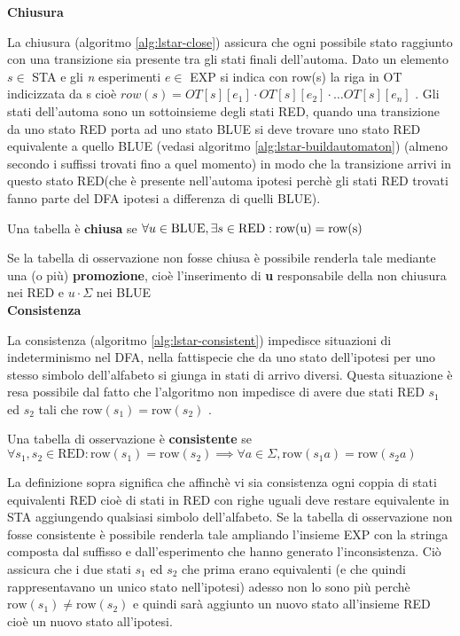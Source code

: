 {\large\textbf{Chiusura}}

La chiusura (algoritmo \ref{alg:lstar-close}) assicura che ogni possibile stato raggiunto con una transizione sia presente tra gli stati finali dell'automa. Dato un elemento $s \in$ STA e gli \textit{n} esperimenti $e \in $ EXP si indica con row(s) la riga in OT indicizzata da s cioè $row(s)=OT[s][e_1] \cdot OT[s][e_2] \cdot \dots OT[s][e_n]$ . Gli stati dell'automa sono un sottoinsieme degli stati RED, quando una transizione da uno stato RED porta ad uno stato BLUE  si deve trovare uno stato RED equivalente a quello BLUE (vedasi algoritmo \ref{alg:lstar-buildautomaton}) (almeno secondo i suffissi trovati fino a quel momento) in modo che la transizione arrivi in questo stato RED(che è presente nell'automa ipotesi perchè gli stati RED trovati fanno parte del \ac{DFA} ipotesi a differenza di quelli BLUE).
\begin{definizione*} Una tabella è \textbf{chiusa} se $\forall u \in \text{BLUE}, \exists s\\ \in \text{RED} : \text{row(u)} = \text{row(s)}$
\end{definizione*}
Se la tabella di osservazione non fosse chiusa è possibile renderla tale mediante una (o più) \textbf{promozione}, cioè l'inserimento di \textbf{u} responsabile della non chiusura nei RED e $u \cdot \Sigma$ nei BLUE\\

{\large\textbf{Consistenza}}

La consistenza  (algoritmo \ref{alg:lstar-consistent}) impedisce situazioni di indeterminismo nel DFA, nella fattispecie che da uno stato dell'ipotesi per uno stesso simbolo dell'alfabeto si giunga in stati di arrivo diversi. Questa situazione è resa possibile dal fatto che l'algoritmo non impedisce di avere due stati RED $s_1$ ed $s_2$ tali che $\text{row}(s_1) = \text{row}(s_2)$ . 
\begin{definizione*}Una tabella di osservazione è \textbf{consistente} se $\forall s_1,s_2 \in \text{RED} : \text{row}(s_1)=\text{row}(s_2)\implies\forall a \in \Sigma,\text{row}(s_1a)=\text{row}(s_2a)$
\end{definizione*} 

La definizione sopra significa che affinchè vi sia consistenza ogni coppia di stati equivalenti RED cioè di stati in RED con righe uguali deve restare equivalente in STA aggiungendo qualsiasi simbolo dell'alfabeto. 
Se la tabella di osservazione non fosse consistente è possibile renderla tale ampliando l'insieme EXP con la stringa composta dal suffisso e dall'esperimento che hanno generato l'inconsistenza. Ciò assicura che i due stati $s_1$ ed $s_2$ che prima erano equivalenti (e che quindi rappresentavano un unico stato nell'ipotesi) adesso non lo sono più perchè  $\text{row}(s_1) \neq \text{row}(s_2)$ e quindi sarà aggiunto un nuovo stato all'insieme RED cioè un nuovo stato all'ipotesi.

